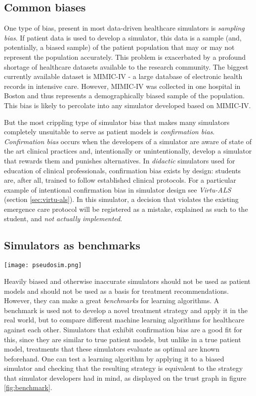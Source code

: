 \subsection{Common biases}
\label{sec:bias}

One type of bias, present in most data-driven healthcare simulators is \emph{sampling bias}.
If patient data is used to develop a simulator, this data is a sample (and, potentially, a biased sample) of the patient population that may or may not represent the population accurately.
This problem is exacerbated by a profound shortage of healthcare datasets available to the research community.
The biggest currently available dataset is MIMIC-IV \cite{mimic} - a large database of electronic health records in intensive care.
However, MIMIC-IV was collected in one hospital in Boston and thus represents a demographically biased sample of the population.
This bias is likely to percolate into any simulator developed based on MIMIC-IV.

But the most crippling type of simulator bias that makes many simulators completely unsuitable to serve as patient models is \emph{confirmation bias}.
\emph{Confirmation bias} occurs when the developers of a simulator are aware of state of the art clinical practices and, intentionally or unintentionally, develop a simulator that rewards them and punishes alternatives.  
In \emph{didactic} simulators used for education of clinical professionals, confirmation bias exists by design: students are, after all, trained to follow established clinical protocols.
For a particular example of intentional confirmation bias in simulator design see \emph{Virtu-ALS} (section \ref{sec:virtu-als}). 
In this simulator, a decision that violates the existing emergence care protocol will be registered as a mistake, explained as such to the student, and \emph{not actually implemented}.

\subsection{Simulators as benchmarks}

\begin{figure*}
    \centering
    \texttt{[image: pseudosim.png]}
    \caption{Trust graph of simulator as a benchmark}
    \label{fig:benchmark}
\end{figure*}

Heavily biased and otherwise inaccurate simulators should not be used as patient models and should not be used as a basis for treatment recommendations. 
However, they can make a great \emph{benchmarks} for learning algorithms.
A benchmark is used not to develop a novel treatment strategy and apply it in the real world, but to compare different machine learning algorithms for healthcare against each other. 
Simulators that exhibit confirmation bias are a good fit for this, since they are similar to true patient models, but unlike in a true patient model, treatments that these simulators evaluate as optimal are known beforehand. 
One can test a learning algorithm by applying it to a biased simulator and checking that the resulting strategy is equivalent to the strategy that simulator developers had in mind, as displayed on the trust graph in figure \ref{fig:benchmark}.

